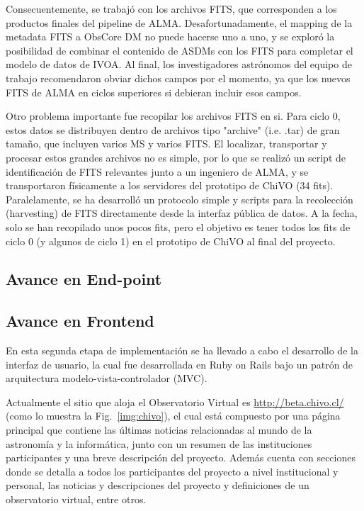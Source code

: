 Consecuentemente, se trabajó con los archivos FITS, que corresponden
a los productos finales del pipeline de ALMA. 
Desafortunadamente, el mapping de la metadata FITS a ObsCore DM no
puede hacerse uno a uno, y se exploró la posibilidad de combinar
el contenido de ASDMs con los FITS para completar el modelo
de datos de IVOA. Al final, los investigadores astrónomos del equipo
de trabajo recomendaron obviar dichos campos por el momento, ya que
los nuevos FITS de ALMA en ciclos superiores si debieran incluir esos campos.

Otro problema importante fue recopilar los archivos FITS en si.
Para ciclo 0, estos datos se distribuyen dentro de archivos tipo
"archive" (i.e. .tar) de gran tamaño, que incluyen varios MS y 
varios FITS. El localizar, transportar y procesar estos grandes archivos
no es simple, por lo que se realizó un script de identificación de FITS
relevantes junto a un ingeniero de ALMA, y se transportaron físicamente
a los servidores del prototipo de ChiVO (34 fits). Paralelamente,
se ha desarrolló un protocolo simple y scripts para la recolección 
(harvesting) de FITS directamente desde la interfaz pública de datos.
A la fecha, solo se han recopilado unos pocos fits, pero el objetivo
es tener todos los fits de ciclo 0 (y algunos de ciclo 1) en el prototipo
de ChiVO al final del proyecto.



\subsection{Avance en End-point}

\subsection{Avance en Frontend}

En esta segunda etapa de implementación se ha llevado a cabo el
desarrollo de la interfaz de usuario, la cual fue desarrollada en
Ruby on Rails bajo un patrón de arquitectura modelo-vista-controlador
(MVC).

Actualmente el sitio que aloja el Observatorio Virtual es
\url{http://beta.chivo.cl/} (como lo muestra la Fig.~\ref{img:chivo}),
el cual está compuesto por una página principal que contiene las
últimas noticias relacionadas al mundo de la astronomía y la
informática, junto con un resumen de las instituciones participantes y
una breve descripción del proyecto. Además cuenta con secciones donde
se detalla a todos los participantes del proyecto a nivel
institucional y personal, las noticias y descripciones del proyecto y
definiciones de un observatorio virtual, entre otros.

